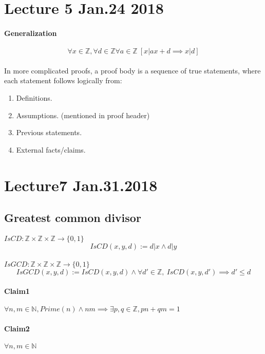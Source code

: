 \documentclass{article}
\begin{document}
	\section{Lecture 5 Jan.24 2018}
	\paragraph{Generalization}
	\[
		\forall x \in \mathbb{Z}, \forall d \in \mathbb{Z} \forall a \in \mathbb{Z}\ [x \vert ax + d \implies x \vert d]
	\]
	\paragraph{} In more complicated proofs, a proof body is a sequence of true statements, where each statement follows logically from:
	\begin{enumerate}
		\item Definitions.
		\item Assumptions. (mentioned in proof header)
		\item Previous statements.
		\item External facts/claims.
	\end{enumerate}
	
	\section{Lecture7 Jan.31.2018}
	\subsection{Greatest common divisor}
	\paragraph{} $IsCD: \mathbb{Z} \times \mathbb{Z} \times \mathbb{Z} \to \{0,1\}$
	\[
		IsCD(x,y,d) := d \vert x \land d \vert y
	\]
	\paragraph{} $IsGCD: \mathbb{Z} \times \mathbb{Z} \times \mathbb{Z} \to \{0,1\}$
	\[
		IsGCD(x,y,d) := IsCD(x,y,d) \land \forall d' \in \mathbb{Z},\ IsCD(x,y,d') \implies d' \leq d
	\]
	\paragraph{Claim1} $\forall n,m \in \mathbb{N}, Prime(n) \land n m \implies \exists p,q \in \mathbb{Z}, pn+qm=1$
	\paragraph{Claim2} $\forall n, m \in \mathbb{N}$
\end{document}
